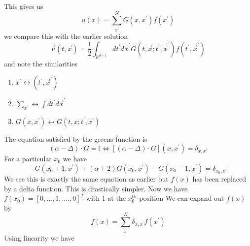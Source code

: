 \documentclass[11pt,a4paper]{article}
\begin{document}
This gives us
$$
u(x)=\sum_{x^{\prime}}^{N}G(x,x^{\prime})f(x^{\prime})$$
we compare this with the earlier solution
$$
\vec{u}(t,\vec{x})= \frac{1}{2}\int_{\mathbb{R}^{d+1}}dt^{\prime}d\vec{x}^{\prime}G(t,\vec{x};t^{\prime},\vec{x}^{\prime}) f(t^{\prime},\vec{x}^{\prime})
$$ 
and note the similarities
\begin{enumerate}
\item $x^{\prime}\leftrightarrow(t^{\prime},\vec{x}^{\prime})$	
\item $\sum_{x^{\prime}}\leftrightarrow \int dt^{\prime}d\vec{x}^{\prime}$
\item $G(x,x^{\prime})\leftrightarrow G(t,x;t^{\prime},x^{\prime})$
\end{enumerate}
The equation satisfied by the greens function is 
$$
(\alpha-\Delta)\cdot G = \mathbb{I} \Leftrightarrow [(\alpha-\Delta)\cdot G](x,x^{\prime}) = \delta_{x,x^{\prime}}
$$
For a particular $x_{0}$ we have
$$
-G(x_{0}+1,x^{\prime})+(\alpha+2)G(x_{0},x^{\prime})-G(x_{0}-1,x^{\prime})= \delta_{x_{0},x^{\prime}}
$$
We see this is exactly the same equation as earlier but $f(x)$ has been replaced by a delta function. This is drastically simpler. Now we have $f(x_{0}) = [0,...,1,....,0]^{T}$ with 1 at the $x_{0}^{\text{th}}$ position
We can expand out $f(x)$ by
$$
f(x) = \sum_{x^{\prime}}^{N}\delta_{x,x^{\prime}}f(x^{\prime})
$$
Using linearity we have
\end{document}
